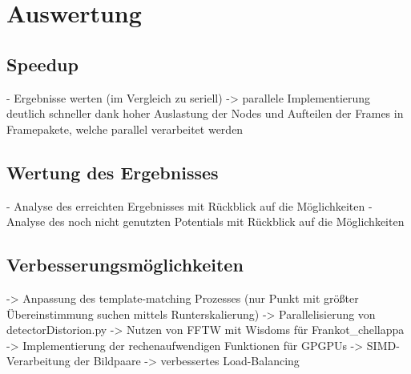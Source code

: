 \chapter{Auswertung}

\section{Speedup}

\begin{correctmore}
	- Ergebnisse werten (im Vergleich zu seriell)
	-> parallele Implementierung deutlich schneller dank hoher Auslastung der Nodes und Aufteilen der Frames in Framepakete, welche parallel verarbeitet werden
\end{correctmore}
\section{Wertung des Ergebnisses}

\begin{correctmore}
	- Analyse des erreichten Ergebnisses mit Rückblick auf die Möglichkeiten
	- Analyse des noch nicht genutzten Potentials mit Rückblick auf die Möglichkeiten
\end{correctmore}

\section{Verbesserungsmöglichkeiten}

\begin{correctmore}
	-> Anpassung des template-matching Prozesses (nur Punkt mit größter Übereinstimmung suchen mittels Runterskalierung)
	-> Parallelisierung von detectorDistorion.py
	-> Nutzen von FFTW mit Wisdoms für Frankot\_chellappa
	-> Implementierung der rechenaufwendigen Funktionen für GPGPUs
	-> SIMD-Verarbeitung der Bildpaare
	-> verbessertes Load-Balancing
\end{correctmore}